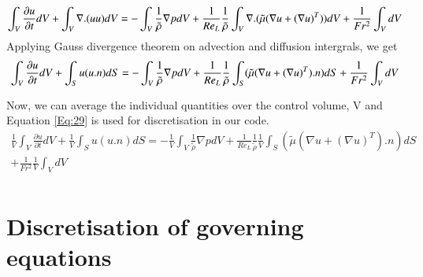 \begin{equation}
\int_V \frac{\partial  u}{\partial  t}dV +\int_V \nabla .( u  u)dV  = -\int_V\frac{1}{\tilde\rho}\nabla  p dV
 + \frac{1}{Re_L}\frac{1}{\tilde\rho} \int_V\nabla .(\tilde\mu (\nabla  u + (\nabla  u)^T))dV +  \frac{1}{Fr^2}\int_V dV \nonumber \\
 \label{Eq:27}
\end{equation}
Applying Gauss divergence theorem on advection and diffusion intergrals, we get
\begin{equation}
\int_V \frac{\partial  u}{\partial  t}dV +\int_S u(u.n)dS  = -\int_V\frac{1}{\tilde\rho}\nabla  p dV
 + \frac{1}{Re_L}\frac{1}{\tilde\rho} \int_S (\tilde\mu (\nabla  u + (\nabla  u)^T).n)dS +  \frac{1}{Fr^2}\int_VdV \nonumber \\
 \label{Eq:28}
\end{equation}

Now, we can average the individual quantities over the control volume, V and Equation \ref{Eq:29} is used for discretisation in our code.
\begin{eqnarray}
\frac{1}{V}\int_V \frac{\partial  u}{\partial  t}dV +\frac{1}{V}\int_S u(u.n)dS  = -\frac{1}{V}\int_V\frac{1}{\tilde\rho}\nabla  p dV \nonumber
 + \frac{1}{Re_L}\frac{1}{\tilde\rho} \frac{1}{V}\int_S (\tilde\mu (\nabla  u + (\nabla  u)^T).n)dS \nonumber \\
 +  \frac{1}{Fr^2}\frac{1}{V}\int_VdV \nonumber \\
 \label{Eq:29}
\end{eqnarray}

\section{Discretisation of governing equations}
